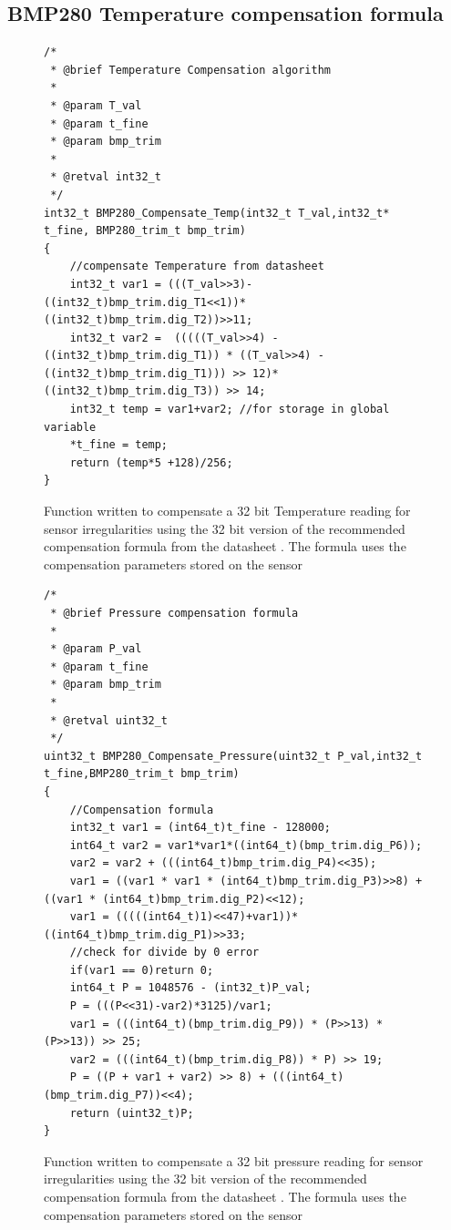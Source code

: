 \subsection{BMP280 Temperature compensation formula}
\begin{figure}[H]

\begin{lstlisting}
/*
 * @brief Temperature Compensation algorithm
 *
 * @param T_val
 * @param t_fine
 * @param bmp_trim
 *
 * @retval int32_t
 */
int32_t BMP280_Compensate_Temp(int32_t T_val,int32_t* t_fine, BMP280_trim_t bmp_trim)
{
	//compensate Temperature from datasheet
	int32_t var1 = (((T_val>>3)- ((int32_t)bmp_trim.dig_T1<<1))*((int32_t)bmp_trim.dig_T2))>>11;
	int32_t var2 =  (((((T_val>>4) - ((int32_t)bmp_trim.dig_T1)) * ((T_val>>4) - ((int32_t)bmp_trim.dig_T1))) >> 12)*((int32_t)bmp_trim.dig_T3)) >> 14;
	int32_t temp = var1+var2; //for storage in global variable
	*t_fine = temp;
	return (temp*5 +128)/256;
}

\end{lstlisting}
    \caption{Function written to compensate  a 32 bit Temperature reading for sensor irregularities using the 32 bit version of the recommended compensation formula from the datasheet \cite{BMP280_Datasheet}. The formula uses the compensation parameters stored on the sensor}
    \label{fig:bmp_code_comp_T}
\end{figure}

\begin{figure}[H]
\begin{lstlisting}
/*
 * @brief Pressure compensation formula
 *
 * @param P_val
 * @param t_fine
 * @param bmp_trim
 *
 * @retval uint32_t
 */
uint32_t BMP280_Compensate_Pressure(uint32_t P_val,int32_t t_fine,BMP280_trim_t bmp_trim)
{
	//Compensation formula
	int32_t var1 = (int64_t)t_fine - 128000;
	int64_t var2 = var1*var1*((int64_t)(bmp_trim.dig_P6));
	var2 = var2 + (((int64_t)bmp_trim.dig_P4)<<35);
	var1 = ((var1 * var1 * (int64_t)bmp_trim.dig_P3)>>8) + ((var1 * (int64_t)bmp_trim.dig_P2)<<12);
	var1 = (((((int64_t)1)<<47)+var1))*((int64_t)bmp_trim.dig_P1)>>33;
	//check for divide by 0 error
	if(var1 == 0)return 0;
	int64_t P = 1048576 - (int32_t)P_val;
	P = (((P<<31)-var2)*3125)/var1;
	var1 = (((int64_t)(bmp_trim.dig_P9)) * (P>>13) * (P>>13)) >> 25;
	var2 = (((int64_t)(bmp_trim.dig_P8)) * P) >> 19;
	P = ((P + var1 + var2) >> 8) + (((int64_t)(bmp_trim.dig_P7))<<4);
	return (uint32_t)P;
}

\end{lstlisting}
    \caption{Function written to compensate  a 32 bit pressure reading for sensor irregularities using the 32 bit version of the recommended compensation formula from the datasheet \cite{BMP280_Datasheet}. The formula uses the compensation parameters stored on the sensor}
    \label{fig:bmp_code_comp_P}
\end{figure}

